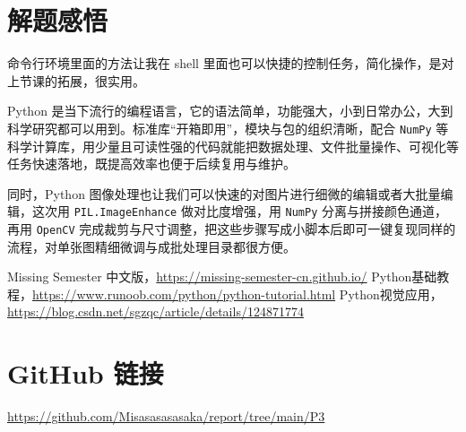\documentclass[a4paper,12pt]{ctexart}
\begin{document}
\newpage

\section{解题感悟}

命令行环境里面的方法让我在 shell 里面也可以快捷的控制任务，简化操作，是对上节课的拓展，很实用。

\vspace{14pt}

Python 是当下流行的编程语言，它的语法简单，功能强大，小到日常办公，大到科学研究都可以用到。标准库“开箱即用”，模块与包的组织清晰，配合 \texttt{NumPy} 等科学计算库，用少量且可读性强的代码就能把数据处理、文件批量操作、可视化等任务快速落地，既提高效率也便于后续复用与维护。

\vspace{14pt}

同时，Python 图像处理也让我们可以快速的对图片进行细微的编辑或者大批量编辑，这次用 \texttt{PIL.ImageEnhance} 做对比度增强，用 \texttt{NumPy} 分离与拼接颜色通道，再用 \texttt{OpenCV} 完成裁剪与尺寸调整，把这些步骤写成小脚本后即可一键复现同样的流程，对单张图精细微调与成批处理目录都很方便。


\newpage

\begin{thebibliography}{9}
 Missing Semester 中文版，\url{https://missing-semester-cn.github.io/}
 Python基础教程，\url{https://www.runoob.com/python/python-tutorial.html}
 Python视觉应用，\url{https://blog.csdn.net/sgzqc/article/details/124871774}
\end{thebibliography}

\section*{GitHub 链接}
\begin{center}
\href{https://github.com/Misasasasasaka/report/tree/main/P3}{https://github.com/Misasasasasaka/report/tree/main/P3}
\end{center}
\end{document}
